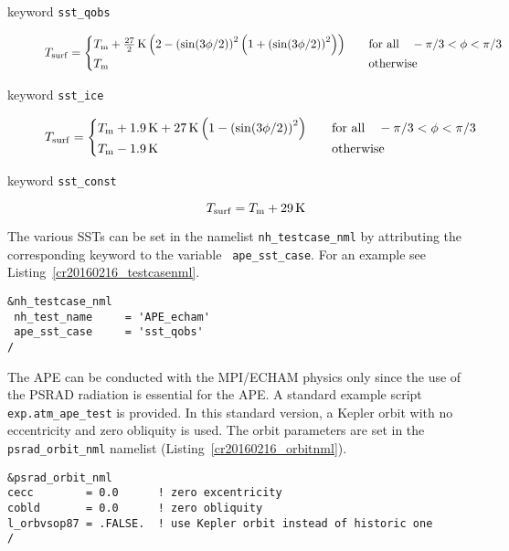 \begin{description}
\item[keyword {\tt sst\_qobs}]
\begin{equation}
T_{\rm surf}=
\begin{cases}
T_{\rm m} + \frac{27}{2}\,{\rm K} \left(2-\left(\sin(3\phi/2)\right)^2
\left(1+\left(\sin(3\phi/2)\right)^2
\right)\right)
&\quad \text{for all} \quad -\pi/3<\phi<\pi/3\\
T_{\rm m} &\quad \text{otherwise}
\end{cases}
\end{equation}
\item[keyword {\tt sst\_ice}]
\begin{equation}
T_{\rm surf}=
\begin{cases}
T_{\rm m} + 1.9\,{\rm K} + 27\,{\rm K} \left(1-\left(\sin(3\phi/2)\right)^2\right)
&\quad \text{for all} \quad -\pi/3<\phi<\pi/3\\
T_{\rm m}-1.9\,{\rm K} &\quad \text{otherwise}
\end{cases}
\end{equation}
\item[keyword {\tt sst\_const}]
\begin{equation}
T_{\rm surf}=T_{\rm m}+29\,{\rm K}
\end{equation}
 
\end{description}

The various SSTs can be set in the namelist {\tt nh\_testcase\_nml} by
attributing the corresponding keyword to the variable {\tt
  ape\_sst\_case}. For an example see Listing~\ref{cr20160216_testcasenml}.

\begin{lstlisting}[caption=Testcase namelist for APE ({\tt
    exp.atm\_ape\_test}), label=cr20160216_testcasenml]
&nh_testcase_nml
 nh_test_name     = 'APE_echam'
 ape_sst_case     = 'sst_qobs'
/
\end{lstlisting}

The
APE can be conducted with the MPI/ECHAM physics only since 
the use of the PSRAD radiation is essential for the APE. A standard
example script {\tt exp.atm\_ape\_test} is provided.
In this standard version, a Kepler orbit with no eccentricity and
zero obliquity is used. The orbit parameters are set in the {\tt
  psrad\_orbit\_nml} namelist (Listing~\ref{cr20160216_orbitnml}).

\begin{lstlisting}[caption=Orbit namelist for APE ({\tt exp.atm\_ape\_test}),
label=cr20160216_orbitnml]
&psrad_orbit_nml
cecc        = 0.0      ! zero excentricity
cobld       = 0.0      ! zero obliquity
l_orbvsop87 = .FALSE.  ! use Kepler orbit instead of historic one
/
\end{lstlisting}

